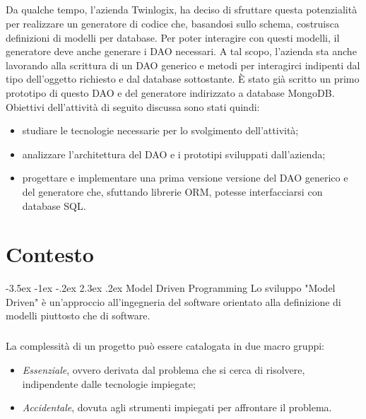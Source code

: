 \documentclass[a4paper, 12pt]{report}
\begin{document}
    \paragraph*{}Da qualche tempo, l'azienda Twinlogix, ha deciso di sfruttare questa potenzialità per realizzare un generatore di codice che, basandosi sullo schema, costruisca definizioni di modelli per database.
    Per poter interagire con questi modelli, il generatore deve anche generare i DAO necessari.
    A tal scopo, l'azienda sta anche lavorando alla scrittura di un DAO generico e metodi per interagirci indipenti dal tipo dell'oggetto richiesto e dal database sottostante.
    È stato già scritto un primo prototipo di questo DAO e del generatore indirizzato a database MongoDB.
    Obiettivi dell'attività di seguito discussa sono stati quindi:
    \begin{itemize}
      \item studiare le tecnologie necessarie per lo svolgimento dell'attività;
      \item analizzare l'architettura del DAO e i prototipi sviluppati dall'azienda;
      \item progettare e implementare una prima versione versione del DAO generico e del generatore che, sfuttando librerie ORM, potesse interfacciarsi con database SQL.
    \end{itemize}
    \renewcommand\section{\@startsection{section}{1}{\z@}%
    {-3.5ex \@plus -1ex \@minus -.2ex}%
    {2.3ex \@plus.2ex}%
    {\normalfont\large\bfseries}}
  \newpage
  \tableofcontents
  \newpage
  \listoffigures
  \chapter{Contesto}
    \section{Model Driven Programming}
      Lo sviluppo "Model Driven" è un'approccio all'ingegneria del software orientato alla definizione di modelli piuttosto che di software.
      \paragraph*{}
      La complessità di un progetto può essere catalogata in due macro gruppi:
      \begin{itemize}
        \item \emph{Essenziale}, ovvero derivata dal problema che si cerca di risolvere, indipendente dalle tecnologie impiegate;
        \item \emph{Accidentale}, dovuta agli strumenti impiegati per affrontare il problema.
      \end{itemize}
\end{document}
